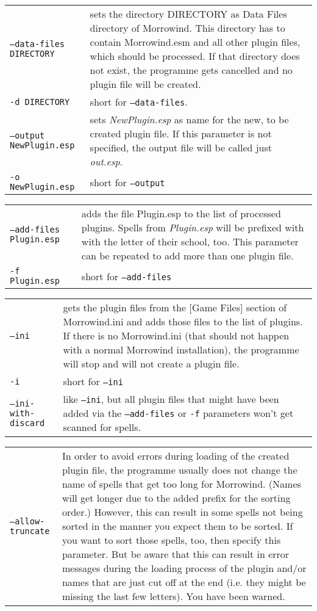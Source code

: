 \documentclass[12pt,oneside,a4paper]{article}
\begin{document}
\begin{tabular}{p{7cm} p{8cm}}
\texttt{--data-files DIRECTORY}   & sets the directory DIRECTORY as Data Files directory of Morrowind. This directory has to contain Morrowind.esm and all other plugin files, which should be processed. If that directory does not exist, the programme gets cancelled and no plugin file will be created.\\
\texttt{-d DIRECTORY}             & short for \texttt{--data-files}.\\
\texttt{--output NewPlugin.esp}   & sets \textit{NewPlugin.esp} as name for the new, to be created plugin file. If this parameter is not specified, the output file will be called just \textit{out.esp}.\\
\texttt{-o NewPlugin.esp}         & short for \texttt{--output}\\
\end{tabular}
\newline
\begin{tabular}{p{7cm} p{8cm}}
\texttt{--add-files Plugin.esp}   & adds the file Plugin.esp to the list of processed plugins. Spells from \textit{Plugin.esp} will be prefixed with with the letter of their school, too. This pa\-ra\-me\-ter can be repeated to add more than one plugin file.\\
\texttt{-f Plugin.esp}            & short for \texttt{--add-files}\\
\end{tabular}
\newline
\begin{tabular}{p{7cm} p{8cm}}
\texttt{--ini}                    & gets the plugin files from the [Game Files] section of Morrowind.ini and adds those files to the list of plugins. If there is no Morrowind.ini (that should not happen with a normal Morrowind installation), the programme will stop and will not create a plugin file.\\
\texttt{-i}                       & short for \texttt{--ini}\\
\texttt{--ini-with-discard}       & like \texttt{--ini}, but all plugin files that might have been added via the \texttt{--add-files} or \texttt{-f} parameters won't get scanned for spells.\\
\end{tabular}
\newline
\begin{tabular}{p{7cm} p{8cm}}
\texttt{--allow-truncate}         & In order to avoid errors during loading of the created plugin file, the programme usually does not change the name of spells that get too long for Morrowind. (Names will get longer due to the added prefix for the sorting order.) However, this can result in some spells not being sorted in the manner you expect them to be sorted. If you want to sort those spells, too, then specify this parameter. But be aware that this can result in error messages during the loading process of the plugin and/or names that are just cut off at the end (i.e. they might be missing the last few letters). You have been warned.\\
\end{tabular}
\end{document}
